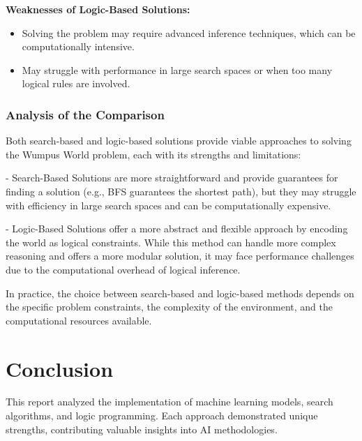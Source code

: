 \documentclass[12pt]{article}
\begin{document}
\textbf{Weaknesses of Logic-Based Solutions:}
\begin{itemize}
    \item Solving the problem may require advanced inference techniques, which can be computationally intensive.
    \item May struggle with performance in large search spaces or when too many logical rules are involved.
\end{itemize}

\subsubsection{Analysis of the Comparison}
Both search-based and logic-based solutions provide viable approaches to solving the Wumpus World problem, each with its strengths and limitations:

- Search-Based Solutions are more straightforward and provide guarantees for finding a solution (e.g., BFS guarantees the shortest path), but they may struggle with efficiency in large search spaces and can be computationally expensive.
  
- Logic-Based Solutions offer a more abstract and flexible approach by encoding the world as logical constraints. While this method can handle more complex reasoning and offers a more modular solution, it may face performance challenges due to the computational overhead of logical inference.

In practice, the choice between search-based and logic-based methods depends on the specific problem constraints, the complexity of the environment, and the computational resources available.

\newpage
\section{Conclusion}
This report analyzed the implementation of machine learning models, search algorithms, and logic programming. Each approach demonstrated unique strengths, contributing valuable insights into AI methodologies.
\end{document}
